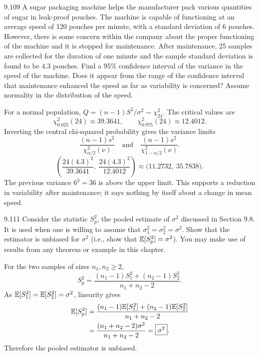 \documentclass[11pt,oneside]{article}
\begin{document}
\begin{exercise}{9.109}
A sugar packaging machine helps the manufacturer pack various quantities of sugar in leak-proof pouches. The machine is capable of functioning at an average speed of 120 pouches per minute, with a standard deviation of 6 pouches. However, there is some concern within the company about the proper functioning of the machine and it is stopped for maintenance. After maintenance, 25 samples are collected for the duration of one minute and the sample standard deviation is found to be 4.3 pouches. Find a 95\% confidence interval of the variance in the speed of the machine. Does it appear from the range of the confidence interval that maintenance enhanced the speed as far as variability is concerned? Assume normality in the distribution of the speed.
\end{exercise}
\begin{solution}
For a normal population, $Q=(n-1)S^2/\sigma^2\sim\chi^2_{24}$. The critical values are
\[
\chi^2_{0.025}(24)\approx39.3641,\qquad\chi^2_{0.975}(24)\approx12.4012.
\]
Inverting the central chi-squared probability gives the variance limits
\[
\frac{(n-1)s^2}{\chi^2_{\alpha/2}(\nu)}\quad\text{and}\quad\frac{(n-1)s^2}{\chi^2_{1-\alpha/2}(\nu)}.
\]
\[
\left(\frac{24(4.3)^2}{39.3641},\ \frac{24(4.3)^2}{12.4012}\right)\approx\boxed{\bigl(11.2732,\ 35.7838\bigr)}.
\]
The previous variance $6^2=36$ is above the upper limit. This supports a reduction in variability after maintenance; it says nothing by itself about a change in mean speed.
\end{solution}

\begin{exercise}{9.111}
Consider the statistic $S_p^2$, the pooled estimate of $\sigma^2$ discussed in Section 9.8. It is used when one is willing to assume that $\sigma_1^2=\sigma_2^2=\sigma^2$. Show that the estimator is unbiased for $\sigma^2$ (i.e., show that $\mathbb{E}[S_p^2]=\sigma^2$). You may make use of results from any theorem or example in this chapter.
\end{exercise}
\begin{solution}
For the two samples of sizes $n_1,n_2\ge2$,
\[
S_p^2=\frac{(n_1-1)S_1^2+(n_2-1)S_2^2}{n_1+n_2-2}.
\]
As $\mathbb{E}[S_1^2]=\mathbb{E}[S_2^2]=\sigma^2$, linearity gives
\[
\begin{aligned}\mathbb{E}[S_p^2]&=\frac{(n_1-1)\mathbb{E}[S_1^2]+(n_2-1)\mathbb{E}[S_2^2]}{n_1+n_2-2}\\&=\frac{(n_1+n_2-2)\sigma^2}{n_1+n_2-2}=\boxed{\sigma^2}.\end{aligned}
\]
Therefore the pooled estimator is unbiased.
\end{solution}
\end{document}
